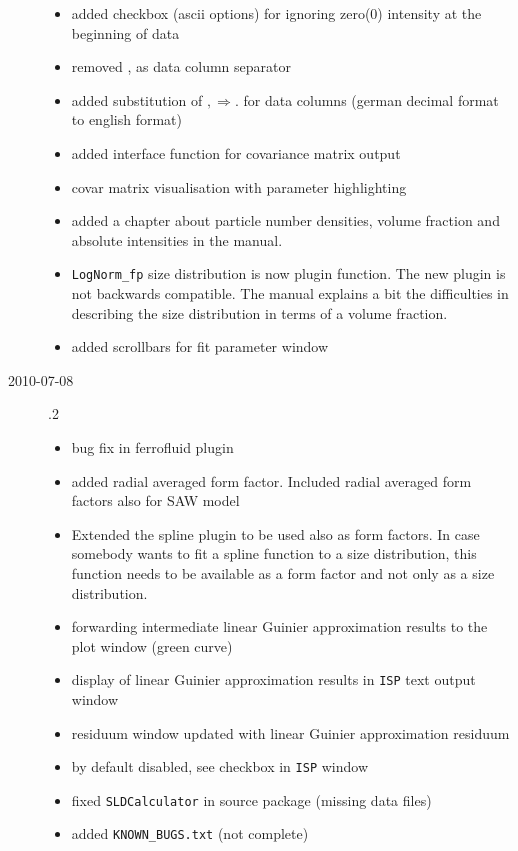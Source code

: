 \begin{description}
\begin{itemize}
        \item added checkbox (ascii options) for ignoring zero(0) intensity at the beginning
                of data
        \item removed , as data column separator
        \item added substitution of $, \Rightarrow .$   for data columns
                (german decimal format to english format)
        \item added interface function for covariance matrix output
        \item covar matrix visualisation with parameter highlighting
        \item added a chapter about particle number densities, volume fraction
            and absolute intensities in the manual.
        \item \texttt{LogNorm\_fp} size distribution is now plugin function.
            The new plugin is not backwards compatible.
            The manual explains a bit the difficulties in describing the size distribution
            in terms of a volume fraction.
        \item added scrollbars for fit parameter window
        \end{itemize}
    \item[2010-07-08] .2
        \begin{itemize}
        \item bug fix in ferrofluid plugin
        \item added radial averaged form factor. Included radial averaged form factors also for SAW model
        \item Extended the spline plugin to be used also as form factors. In case somebody wants to fit a spline function to a size distribution, this function needs to be available as a form factor and not only as a size distribution.
        \item forwarding intermediate linear Guinier approximation results to the plot window (green curve)
        \item display of linear Guinier approximation results in \texttt{ISP} text output window
        \item residuum window updated with linear Guinier approximation residuum
        \item by default disabled, see checkbox in \texttt{ISP} window
        \item fixed \texttt{SLDCalculator} in source package (missing data files)
        \item added \texttt{KNOWN\_BUGS.txt} (not complete)

\end{itemize}
\end{description}
